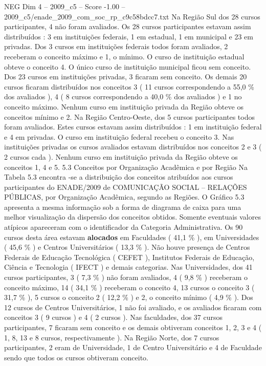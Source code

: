 \begin{textsample}{NEG Dim 4 – 2009\_c5 – Score -1.00 – 2009\_c5/enade\_2009\_com\_soc\_rp\_c9c58bdcc7.txt}
Na Região Sul dos 28 cursos participantes, 4 não foram avaliados.
Os 28 cursos participantes estavam assim distribuídos : 3 em instituições federais, 1 em estadual, 1 em municipal e 23 em privadas.
Dos 3 cursos em instituições federais todos foram avaliados, 2 receberam o conceito máximo e 1, o mínimo.
O curso de instituição estadual obteve o conceito 4.
O único curso de instituição municipal ficou sem conceito.
Dos 23 cursos em instituições privadas, 3 ficaram sem conceito.
Os demais 20 cursos ficaram distribuídos nos conceitos 3 ( 11 cursos correspondendo a 55,0 \% dos avaliados ), 4 ( 8 cursos correspondendo a 40,0 \% dos avaliados ) e 1 no conceito máximo.
Nenhum curso em instituição privada da Região obteve os conceitos mínimo e 2.
Na Região Centro-Oeste, dos 5 cursos participantes todos foram avaliados.
Estes cursos estavam assim distribuídos : 1 em instituição federal e 4 em privadas.
O curso em instituição federal recebeu o conceito 3.
Nas instituições privadas os cursos avaliados estavam distribuídos nos conceitos 2 e 3 ( 2 cursos cada ).
Nenhum curso em instituição privada da Região obteve os conceitos 1, 4 e 5. 5.3 Conceitos por Organização Acadêmica e por Região Na Tabela 5.3 encontra -se a distribuição dos conceitos atribuídos aos cursos participantes do ENADE/2009 de COMUNICAÇÃO SOCIAL – RELAÇÕES PÚBLICAS, por Organização Acadêmica, segundo as Regiões.
O Gráfico 5.3 apresenta a mesma informação sob a forma de diagrama de caixa para uma melhor visualização da dispersão dos conceitos obtidos.
Somente eventuais valores atípicos apareceram com o identificador da Categoria Administrativa.
Os 90 cursos desta área estavam \textbf{alocados} em Faculdades ( 41,1 \% ), em Universidades ( 45,6 \% ) e Centros Universitários ( 13,3 \% ).
Não houve presença de Centros Federais de Educação Tecnológica ( CEFET ), Institutos Federais de Educação, Ciência e Tecnologia ( IFECT ) e demais categorias.
Nas Universidades, dos 41 cursos participantes, 3 ( 7,3 \% ) não foram avaliados, 4 ( 9,8 \% ) receberam o conceito máximo, 14 ( 34,1 \% ) receberam o conceito 4, 13 cursos o conceito 3 ( 31,7 \% ), 5 cursos o conceito 2 ( 12,2 \% ) e 2, o conceito mínimo ( 4,9 \% ).
Dos 12 cursos de Centros Universitários, 1 não foi avaliado, e os avaliados ficaram com conceitos 3 ( 9 cursos ) e 4 ( 2 cursos ).
Nas faculdades, dos 37 cursos participantes, 7 ficaram sem conceito e os demais obtiveram conceitos 1, 2, 3 e 4 ( 1, 8, 13 e 8 cursos, respectivamente ).
Na Região Norte, dos 7 cursos participantes, 2 eram de Universidade, 1 de Centro Universitário e 4 de Faculdade sendo que todos os cursos obtiveram conceito.

\end{textsample}
